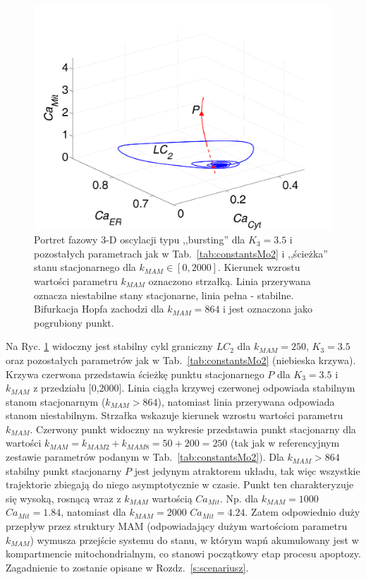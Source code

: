 \begin{figure}[ht]
    \centering
    \includegraphics[width=1\textwidth]{rysunki/rozdzial_5/diagram3_5}
    \caption[Portret fazowy 3-D oscylacji typu ,,bursting''w Modelu \#2]{Portret fazowy 3-D oscylacji typu ,,bursting'' dla $K_3=3.5$ i pozostałych parametrach jak w Tab.~\ref{tab:constantsMo2} i ,,ścieżka'' stanu stacjonarnego dla $k_{MAM} \in [0, 2000]$. Kierunek wzrostu wartości parametru $k_{MAM}$ oznaczono strzałką. Linia przerywana oznacza niestabilne stany stacjonarne, linia pełna - stabilne. Bifurkacja Hopfa zachodzi dla $k_{MAM} = 864$ i jest oznaczona jako pogrubiony punkt.}
    \label{fig:diagram3_5}
\end{figure}


Na Ryc. \ref{fig:diagram3_5} widoczny jest stabilny cykl graniczny $LC_2$ dla $k_{MAM} = 250$, $K_3 = 3.5$ oraz pozostałych parametrów jak w Tab.~\ref{tab:constantsMo2} (niebieska krzywa). Krzywa czerwona przedstawia ścieżkę punktu stacjonarnego $P$ dla $K_3 = 3.5$ i $k_{MAM}$ z przedziału [0,2000]. Linia ciągła krzywej czerwonej odpowiada stabilnym stanom stacjonarnym ($k_{MAM} > 864$), natomiast linia przerywana odpowiada stanom niestabilnym. Strzałka wskazuje kierunek wzrostu wartości parametru $k_{MAM}$. Czerwony punkt widoczny na wykresie przedstawia punkt stacjonarny dla wartości  $k_{MAM}=k_{MAM2}+k_{MAM8}=50+200=250$ (tak jak w referencyjnym zestawie parametrów podanym w Tab.~\ref{tab:constantsMo2}). 
Dla $k_{MAM} > 864$ stabilny punkt stacjonarny $P$ jest jedynym atraktorem układu, tak więc wszystkie trajektorie zbiegają do niego asymptotycznie w czasie. Punkt ten charakteryzuje się wysoką, rosnącą wraz z $k_{MAM}$ wartością $Ca_{Mit}$. Np. dla $k_{MAM} = 1000$ $Ca_{Mit} = 1.84$, natomiast dla  $k_{MAM} = 2000$ $Ca_{Mit} = 4.24$. Zatem odpowiednio duży przepływ przez struktury MAM (odpowiadający dużym wartościom parametru $k_{MAM}$) wymusza przejście systemu do stanu, w którym wapń akumulowany jest w kompartmencie mitochondrialnym, co stanowi początkowy etap procesu apoptozy. Zagadnienie to zostanie opisane w Rozdz.~\ref{s:scenariusz}.


